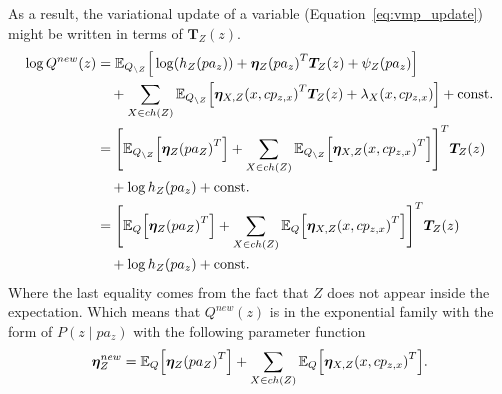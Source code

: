 As a result, the variational update of a variable (Equation~\ref{eq:vmp_update}) might be written in terms of \(\bm{T}_{Z}(z)\).
\[
    \begin{aligned}
     \log Q^{new}(z) &= \mathbb{E}_{Q_{\backslash Z}}\Big[\log(h_Z (pa_z)) + \bm{\eta}_Z{(pa_z)}^T \bm{T}_Z(z) + \psi_Z(pa_z)\Big]\\
     &\quad+ \sum_{X \in ch(Z)} \mathbb{E}_{Q_{\backslash Z}}\Big[ \bm{\eta}_{X, Z}{(x, cp_{z,x})}^T \bm{T}_Z(z) + \lambda_{X}(x, cp_{z,x}) \Big] + \text{const.}\\
     &= {\Bigg[ \mathbb{E}_{Q_{\backslash Z}}\Big[\bm{\eta}_Z{(pa_Z)}^T\Big] + \sum_{X \in ch(Z)} \mathbb{E}_{Q_{\backslash Z}}\Big[ \bm{\eta}_{X, Z}{(x, cp_{z,x})}^T\Big]  \Bigg]}^T \bm{T}_Z(z) \\
     &\quad+ \log h_{Z}(pa_z)+ \text{const.}\\
     &= {\Bigg[ \mathbb{E}_{Q}\Big[\bm{\eta}_Z{(pa_Z)}^T\Big] + \sum_{X \in ch(Z)} \mathbb{E}_{Q}\Big[ \bm{\eta}_{X, Z}{(x, cp_{z,x})}^T\Big]  \Bigg]}^T \bm{T}_Z(z) \\
     &\quad+ \log h_{Z}(pa_z)+ \text{const.}
   \end{aligned}
 \]
 Where the last equality comes from the fact that \(Z\) does not appear inside the expectation. Which means that \( Q^{new}(z) \) is in the exponential family with the form of \( P(z \mid pa_z) \) with the following parameter function
 \begin{equation}\label{eq:vmp_param_update}
   \bm{\eta}^{new}_Z =  \mathbb{E}_{Q}\Big[\bm{\eta}_Z{(pa_Z)}^T\Big] + \sum_{X \in ch(Z)} \mathbb{E}_{Q}\Big[ \bm{\eta}_{X, Z}{(x, cp_{z,x})}^T\Big].
 \end{equation}

